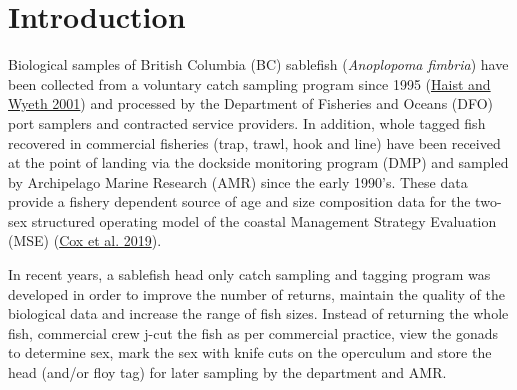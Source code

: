 \documentclass[12pt]{article}\usepackage[]{graphicx}\usepackage[]{color}
\begin{document}

\frontmatter


\renewcommand{\headrulewidth}{0.5pt}  %
\renewcommand{\footrulewidth}{0.5pt}  %

\newcommand{\lt}{\ensuremath <}
\newcommand{\gt}{\ensuremath >}

\newlength{\cslhangindent}
\setlength{\cslhangindent}{1.5em}
\newenvironment{cslreferences}%
  {}%
  {\par}

\hypertarget{introduction}{%
\section{Introduction}\label{introduction}}

Biological samples of British Columbia (BC) sablefish (\emph{Anoplopoma fimbria}) have been collected from a voluntary catch sampling program since 1995 (\protect\hyperlink{ref-Haist2001}{Haist and Wyeth 2001}) and processed by the Department of Fisheries and Oceans (DFO) port samplers and contracted service providers. In addition, whole tagged fish recovered in commercial fisheries (trap, trawl, hook and line) have been received at the point of landing via the dockside monitoring program (DMP) and sampled by Archipelago Marine Research (AMR) since the early 1990's. These data provide a fishery dependent source of age and size composition data for the two-sex structured operating model of the coastal Management Strategy Evaluation (MSE) (\protect\hyperlink{ref-Cox2019}{Cox et al. 2019}).

In recent years, a sablefish head only catch sampling and tagging program was developed in order to improve the number of returns, maintain the quality of the biological data and increase the range of fish sizes. Instead of returning the whole fish, commercial crew j-cut the fish as per commercial practice, view the gonads to determine sex, mark the sex with knife cuts on the operculum and store the head (and/or floy tag) for later sampling by the department and AMR.
\end{document}

